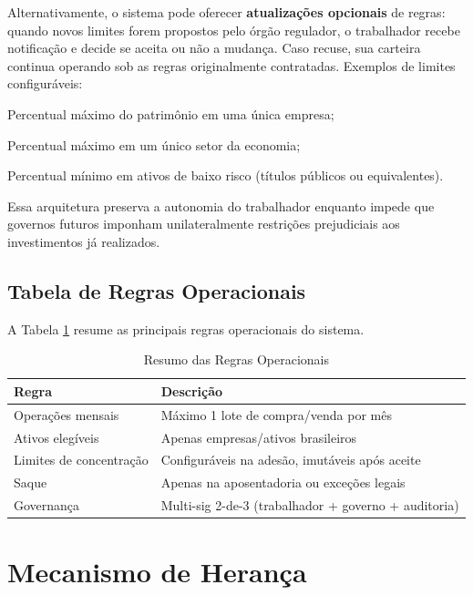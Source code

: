 Alternativamente, o sistema pode oferecer \textbf{atualizações opcionais} de regras: quando novos limites forem propostos pelo órgão regulador, o trabalhador recebe notificação e decide se aceita ou não a mudança. Caso recuse, sua carteira continua operando sob as regras originalmente contratadas. Exemplos de limites configuráveis:

\begin{alineas}
    \item Percentual máximo do patrimônio em uma única empresa;
    \item Percentual máximo em um único setor da economia;
    \item Percentual mínimo em ativos de baixo risco (títulos públicos ou equivalentes).
\end{alineas}

Essa arquitetura preserva a autonomia do trabalhador enquanto impede que governos futuros imponham unilateralmente restrições prejudiciais aos investimentos já realizados.

\subsection{Tabela de Regras Operacionais}

A Tabela \ref{tab:regras} resume as principais regras operacionais do sistema.

\begin{table}[htb]
    \centering
    \caption{Resumo das Regras Operacionais}
    \label{tab:regras}
    \begin{tabular}{p{5cm}p{8cm}}
        \toprule
        \textbf{Regra} & \textbf{Descrição} \\
        \midrule
        Operações mensais & Máximo 1 lote de compra/venda por mês \\
        Ativos elegíveis & Apenas empresas/ativos brasileiros \\
        Limites de concentração & Configuráveis na adesão, imutáveis após aceite \\
        Saque & Apenas na aposentadoria ou exceções legais \\
        Governança & Multi-sig 2-de-3 (trabalhador + governo + auditoria) \\
        \bottomrule
    \end{tabular}
\end{table}

\section{Mecanismo de Herança}

